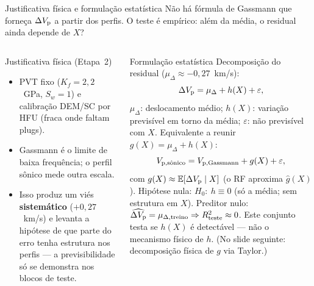 \documentclass[aspectratio=169,10pt]{beamer}
\begin{document}
\begin{frame}[shrink=5]{Justificativa física e formulação estatística}
  \footnotesize
  Não há fórmula de Gassmann que forneça \(\dVp\) a partir dos perfis.
  O teste é empírico: além da média, o residual ainda depende de $X$?
  \vspace{0.06cm}
  \begin{columns}[T,onlytextwidth]
    \begin{block}{Justificativa física (Etapa~2)}
      \scriptsize
      \begin{itemize}
        \item PVT fixo ($K_f=2{,}2$~GPa, $S_w=1$) e calibração DEM/SC
              por HFU (fraca onde faltam plugs).
        \item Gassmann é o limite de baixa frequência; o perfil sônico
              mede outra escala.
        \item Isso produz um viés \textbf{sistemático}
              (\(+0{,}27\)~km/s) e levanta a hipótese de que parte do
              erro tenha estrutura nos perfis --- a previsibilidade
              só se demonstra nos blocos de teste.
      \end{itemize}
    \end{block}
    \begin{exampleblock}{Formulação estatística}
      \scriptsize
      Decomposição do residual
      ($\mu_{\Delta}\approx -0{,}27$~km/s):
      \[
        \dVp = \mu_{\Delta} + h(X) + \varepsilon,
      \]
      \(\mu_{\Delta}\): deslocamento médio;
      \(h(X)\): variação previsível em torno da média;
      \(\varepsilon\): não previsível com $X$.
      Equivalente a reunir \(g(X)=\mu_{\Delta}+h(X)\):
      \[
        \Vpsonsub
        = V_{\mathrm{p,Gassmann}} + g(X) + \varepsilon,
      \]
      com \(g(X)\approx\mathbb{E}[\dVp\mid X]\)
      (o RF aproxima \(\widehat{g}(X)\)).
      Hipótese nula: \(H_0:\ h\equiv 0\)
      (só a média; sem estrutura em $X$).
      Preditor nulo:
      \(\widehat{\dVp}=\mu_{\Delta,\mathrm{treino}}
      \Rightarrow R^{2}_{\mathrm{teste}}\approx 0\).
      Este conjunto testa se \(h(X)\) é detectável ---
      não o mecanismo físico de \(h\).
      (No slide seguinte: decomposição física de \(g\) via Taylor.)
    \end{exampleblock}
  \end{columns}
\end{frame}
\end{document}
